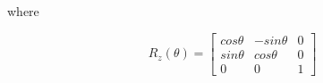 where

$$
R_{z}(\theta)=\begin{bmatrix}
cos\theta &-sin\theta &0\\
sin\theta &cos\theta &0 \\
0 &0 &1
\end{bmatrix}
$$

%
